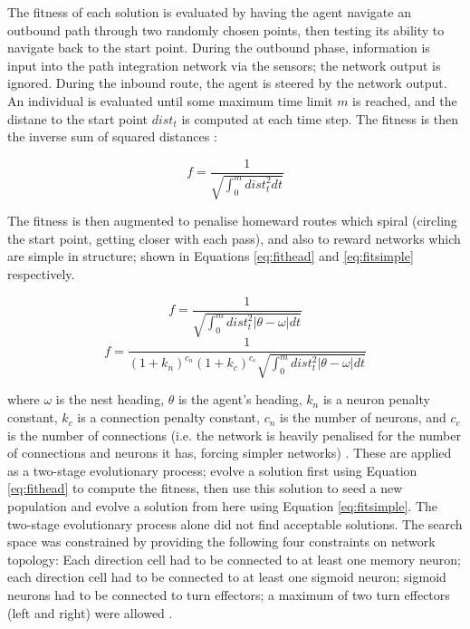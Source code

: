 \documentclass[a4paper,11pt,twoside,openright]{article}
\begin{document}
The fitness of each solution is evaluated by having the agent navigate an
outbound path through two randomly chosen points, then testing its ability
to navigate back to the start point. During the outbound phase, information is
input into the path integration network via the sensors; the network output is
ignored. During the inbound route, the agent is steered by the network output.
An individual is evaluated until some maximum time limit $m$ is reached, and the
distane to the start point $dist_t$ is computed at each time step. The fitness is
then the inverse sum of squared distances \cite{Haferlach2007}:

\begin{equation}
 f = \frac{1}{\sqrt{\int_{0}^m dist_t^2 dt}}
\end{equation}

The fitness is then augmented to penalise homeward routes which
spiral (circling the start point, getting closer with each pass), and
also to reward networks which are simple in structure; shown in
Equations \ref{eq:fithead} and \ref{eq:fitsimple} respectively.

\begin{equation}
  \label{eq:fithead}
  f = \frac{1}{\sqrt{\int_{0}^m dist_t^2 |\theta - \omega | dt}}
\end{equation}
\begin{equation}
  \label{eq:fitsimple}
  f = \frac{1}{(1 + k_n)^{c_n}(1 + k_c)^{c_c}
    \sqrt{\int_{0}^m dist_t^2 |\theta - \omega | dt}}
\end{equation}

where $\omega$ is the nest heading, $\theta$ is the agent's heading,
$k_n$ is a neuron penalty constant, $k_c$ is a connection penalty
constant, $c_n$ is the number of neurons, and $c_c$ is the number of
connections (i.e.  the network is heavily penalised for the number of
connections and neurons it has, forcing simpler networks)
\cite{Haferlach2007}. These are applied as a two-stage evolutionary
process; evolve a solution first using Equation \ref{eq:fithead} to
compute the fitness, then use this solution to seed a new population
and evolve a solution from here using Equation \ref{eq:fitsimple}. The
two-stage evolutionary process alone did not find acceptable
solutions. The search space was constrained by providing the following
four constraints on network topology: Each direction cell had to be
connected to at least one memory neuron; each direction cell had to be
connected to at least one sigmoid neuron; sigmoid neurons had to be
connected to turn effectors; a maximum of two turn effectors (left and
right) were allowed \cite{Haferlach2007}.
\newline
\par
\end{document}
